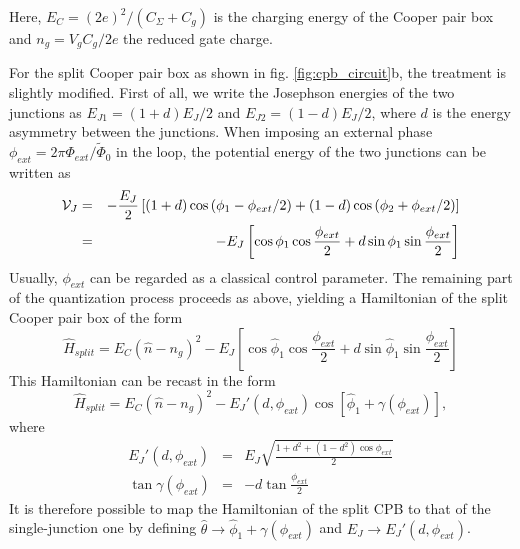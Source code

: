 Here, $E_C = (2e)^2 / (C_\Sigma+C_g)$ is the charging energy of the Cooper pair box and $n_g=V_g C_g /2e $ the reduced gate charge.

\smallskip

For the split Cooper pair box as shown in fig. \ref{fig:cpb_circuit}b, the treatment is slightly modified. First of all, we write the Josephson energies of the two junctions as $E_{J1}=(1+d)E_J/2$ and $E_{J2}=(1-d)E_J/2$, where $d$ is the energy asymmetry between the junctions. When imposing an external phase $\phi_{ext}=2\pi\Phi_{ext}/\tilde{\Phi}_0$ in the loop, the potential energy of the two junctions can be written as
%
\begin{eqnarray}
\begin{mathcal}V\end{mathcal}_J & = & -\frac{E_J}{2}\left[(1+d)\cos{(\phi_1-\phi_{ext}/2)}+(1-d)\cos{(\phi_2+\phi_{ext}/2)} \right] \\
& = & -E_J\left[\cos{\phi_1}\cos{\frac{\phi_{ext}}{2}}+d\sin{\phi_1}\sin{\frac{\phi_{ext}}{2}}\right]
\end{eqnarray}
%
Usually, $\phi_{ext}$ can be regarded as a classical control parameter. The remaining part of the quantization process proceeds as above, yielding a Hamiltonian of the split Cooper pair box of the form
%
\begin{equation}
\hat{H}_{split} = E_C(\hat{n}-n_g)^2-E_J\left[\cos{\hat{\phi}_1}\cos{\frac{\phi_{ext}}{2}}+d\sin{\hat{\phi}_1}\sin{\frac{\phi_{ext}}{2}}\right]
\end{equation}
%
This Hamiltonian can be recast in the form \citep{cottet_implementation_2002}
%
\begin{equation}
\hat{H}_{split} = E_C(\hat{n}-n_g)^2-E_J'(d,\phi_{ext})\cos{[\hat{\phi}_1+\gamma(\phi_{ext})]},
\end{equation}
%
where
%
\begin{eqnarray}
E_J'(d,\phi_{ext}) & = & E_J\sqrt{\frac{1+d^2+(1-d^2)\cos{\phi_{ext}}}{2}} \\
\tan{\gamma(\phi_{ext})} & = & -d\tan{\frac{\phi_{ext}}{2}}
\end{eqnarray}
%
It is therefore possible to map the Hamiltonian of the split CPB to that of the single-junction one by defining $\hat{\theta}\to\hat{\phi}_1+\gamma(\phi_{ext})$ and $E_J\to E_J'(d,\phi_{ext})$. 

